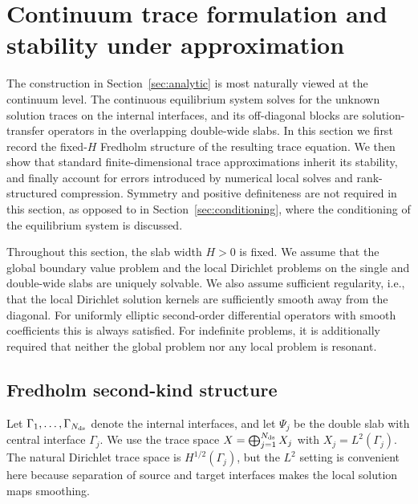 \documentclass[final,onefignum,onetabnum]{siamart250211}
\theoremstyle{definition}
\begin{document}
\section{Continuum trace formulation and stability under approximation}
\label{sec:continuum_trace}
The construction in Section~\ref{sec:analytic} is most naturally viewed at the continuum level. The continuous equilibrium system solves for the unknown solution traces on the internal interfaces, and its off-diagonal blocks are solution-transfer operators in the overlapping double-wide slabs.  In this section we first record the fixed-$H$ Fredholm structure of the resulting trace equation.  We then show that standard finite-dimensional trace approximations inherit its stability, and finally account for errors introduced by numerical local solves and rank-structured compression.  Symmetry and positive definiteness are not required in this section, as opposed to in Section~\ref{sec:conditioning}, where the conditioning of the equilibrium system is discussed.

Throughout this section, the slab width $H>0$ is fixed.  We assume that the global boundary value problem and the local Dirichlet problems on the single and double-wide slabs are uniquely solvable.  We also assume sufficient regularity, i.e., that the local Dirichlet solution kernels are sufficiently smooth away from the diagonal.  For uniformly elliptic second-order differential operators with smooth coefficients this is always satisfied. For indefinite problems, it is additionally required that neither the global problem nor any local problem is resonant.

\subsection{Fredholm second-kind structure}
Let $\Gamma_1,\ldots,\Gamma_{N_{\rm ds}}$ denote the internal interfaces, and let $\Psi_j$ be the double slab with central interface $\Gamma_j$.  We use the trace space
  $X=\bigoplus_{j=1}^{N_{\rm ds}} X_j$ with $X_j=L^2(\Gamma_j)$.
The natural Dirichlet trace space is $H^{1/2}(\Gamma_j)$, but the $L^2$ setting is convenient here because separation of source and target interfaces makes the local solution maps smoothing.
\end{document}
